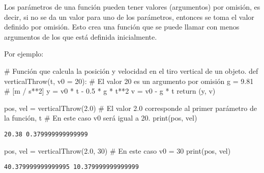 \documentclass[
  letterpaper,
  DIV=11,
  numbers=noendperiod]{scrreprt}
\newenvironment{Shaded}{\begin{snugshade}}{\end{snugshade}}
\newcommand{\BuiltInTok}[1]{\textcolor[rgb]{0.00,0.23,0.31}{#1}}
\newcommand{\CommentTok}[1]{\textcolor[rgb]{0.37,0.37,0.37}{#1}}
\newcommand{\ControlFlowTok}[1]{\textcolor[rgb]{0.00,0.23,0.31}{#1}}
\newcommand{\DecValTok}[1]{\textcolor[rgb]{0.68,0.00,0.00}{#1}}
\newcommand{\FloatTok}[1]{\textcolor[rgb]{0.68,0.00,0.00}{#1}}
\newcommand{\KeywordTok}[1]{\textcolor[rgb]{0.00,0.23,0.31}{#1}}
\newcommand{\NormalTok}[1]{\textcolor[rgb]{0.00,0.23,0.31}{#1}}
\newcommand{\OperatorTok}[1]{\textcolor[rgb]{0.37,0.37,0.37}{#1}}
\begin{document}
Los parámetros de una función pueden tener valores (argumentos) por
omisión, es decir, si no se da un valor para uno de los parámetros,
entonces se toma el valor definido por omisión. Esto crea una función
que se puede llamar con menos argumentos de los que está definida
inicialmente.

Por ejemplo:

\begin{Shaded}
\begin{Highlighting}[]
\CommentTok{\# Función que calcula la posición y velocidad en el tiro vertical de un objeto.}
\KeywordTok{def}\NormalTok{ verticalThrow(t, v0 }\OperatorTok{=} \DecValTok{20}\NormalTok{):  }\CommentTok{\# El valor 20 es un argumento por omisión}
\NormalTok{    g }\OperatorTok{=} \FloatTok{9.81} \CommentTok{\# [m / s**2]}
\NormalTok{    y }\OperatorTok{=}\NormalTok{ v0 }\OperatorTok{*}\NormalTok{ t }\OperatorTok{{-}} \FloatTok{0.5} \OperatorTok{*}\NormalTok{ g }\OperatorTok{*}\NormalTok{ t}\OperatorTok{**}\DecValTok{2} 
\NormalTok{    v }\OperatorTok{=}\NormalTok{ v0 }\OperatorTok{{-}}\NormalTok{ g }\OperatorTok{*}\NormalTok{ t }
    \ControlFlowTok{return}\NormalTok{ (y, v)}
\end{Highlighting}
\end{Shaded}

\begin{Shaded}
\begin{Highlighting}[]
\NormalTok{pos, vel }\OperatorTok{=}\NormalTok{ verticalThrow(}\FloatTok{2.0}\NormalTok{) }\CommentTok{\# El valor 2.0 corresponde al primer parámetro de la función, \textquotesingle{}t\textquotesingle{}}
                              \CommentTok{\# En este caso v0 será igual a 20.}
\BuiltInTok{print}\NormalTok{(pos, vel)}
\end{Highlighting}
\end{Shaded}

\begin{verbatim}
20.38 0.379999999999999
\end{verbatim}

\begin{Shaded}
\begin{Highlighting}[]
\NormalTok{pos, vel }\OperatorTok{=}\NormalTok{ verticalThrow(}\FloatTok{2.0}\NormalTok{, }\DecValTok{30}\NormalTok{) }\CommentTok{\# En este caso v0 = 30}
\BuiltInTok{print}\NormalTok{(pos, vel)}
\end{Highlighting}
\end{Shaded}

\begin{verbatim}
40.379999999999995 10.379999999999999
\end{verbatim}
\end{document}

